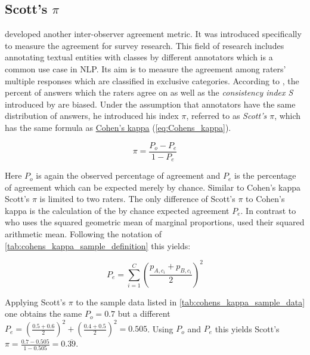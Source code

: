 \subsection{Scott's $\pi$}
\label{chp:fundamentals:sec:inter_rater_agreement:subsec:scotts_pi}
\textcite{Scott:1955} developed another inter-observer agreement metric.
It was introduced specifically to measure the agreement for survey research.
This field of research includes annotating textual entities with classes by different annotators which is a common use case in \ac{NLP}.
Its aim is to measure the agreement among raters' multiple responses which are classified in exclusive categories.
According to \textcite{Scott:1955}, the percent of answers which the raters agree on as well as the \textit{consistency index S} introduced by \textcite{Bennett:1954} are biased.
Under the assumption that annotators have the same distribution of answers, he introduced his index $\pi$, referred to as \textit{Scott's $\pi$}, which has the same formula as \hyperref[chp:fundamentals:sec:inter_rater_agreement:subsec:cohens_kappa]{Cohen's kappa} (\cref{eq:Cohens_kappa}).

\begin{equation}\label{eq:Scotts_pi}
    \pi = \frac{P_o - P_e}{1 - P_e}
\end{equation}

Here $P_o$ is again the observed percentage of agreement and $P_e$ is the percentage of agreement which can be expected merely by chance.
Similar to Cohen's kappa Scott's $\pi$ is limited to two raters.
The only difference of Scott's $\pi$ to Cohen's kappa is the calculation of the by chance expected agreement $P_e$.
In contrast to \textcite{Cohen:1960} who uses the squared geometric mean of marginal proportions, \textcite{Scott:1955} used their squared arithmetic mean.
Following the notation of \cref{tab:cohens_kappa_sample_definition} this yields:

\begin{equation}\label{eq:Scotts_pi:p_e}
    P_e = \sum_{i=1}^{C} (\frac{p_{A, c_i} + p_{B, c_i}}{2})^2
\end{equation}

Applying Scott's $\pi$ to the sample data listed in \cref{tab:cohens_kappa_sample_data} one obtains the same $P_o=0.7$ but a different $P_e = (\frac{0.5 + 0.6}{2})^2 + (\frac{0.4+0.5}{2})^2 = 0.505$.
Using $P_o$ and $P_e$ this yields Scott's $\pi = \frac{0.7 - 0.505}{1-0.505} = 0.\overline{39}$.
